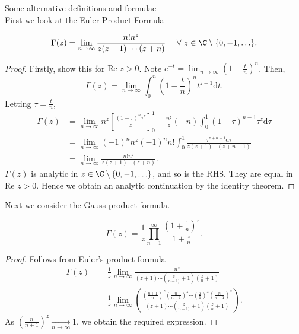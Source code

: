 \documentclass[a4paper]{article}
\begin{document}
\underline{Some alternative definitions and formulae} \\
First we look at the Euler Product Formula
\begin{claim}
    \[
        \Gamma(z) = \lim_{n \to \infty} \frac{n ! n^{z}}{ z( z + 1) \cdots (z +n)} \quad \ \forall \  z \in  \C\setminus \{0,-1, \ldots\} 
    .\]
\end{claim}
\begin{proof}
    Firstly, show this for $\text{Re }z > 0 $. Note $e^{ - t} = \lim_{n \to \infty} \left( 1- \frac{t}{n}\right)^{n}$. Then,
    \[
        \Gamma(z) = \lim_{n \to \infty} \int_0^{n} \left( 1 - \frac{t}{n}\right)^{n} t ^{ z - 1}\text{d}t
    .\]
    Letting $\tau = \frac{t}{n}$,
    \begin{align*}
         \Gamma(z) &= \lim_{n \to \infty} n^{z} \left[ \frac{ (  1 - \tau)^{n} \tau^{z}}{z} \right]_0^{1} - \frac{n^{z}}{z} (-n)\int_0^{1} ( 1- \tau)^{n - 1} \tau^{z} \text{d} \tau \\
        &= \lim_{n \to \infty}(-1)^{n} n^{z} (-1)^{n} n! \int_0^{1} \frac{\tau^{ z + n - 1} \text{d} \tau}{ z ( z + 1) \cdots ( z + n -1)} \\
        &= \lim_{n \to \infty} \frac{ n! n^{z}}{ z ( z + 1) \cdots ( z  + n)}
    .\end{align*}
    $\Gamma(z)$ is analytic in $z \in  \C \setminus \{ 0, -1, \ldots\} $, and so is the RHS. They are equal in $\text{Re }z > 0$. Hence we obtain an analytic continuation by the identity theorem.
\end{proof}
Next we consider the Gauss product formula.
\begin{claim}
     \[
         \Gamma(z) = \frac{1}{z} \prod_{n = 1}^{\infty} \frac{ ( 1+ \frac{1}{n})^{z}}{1 + \frac{z}{n}}
    .\] 
\end{claim}
\begin{proof}
Follows from Euler's product formula
\begin{align*}
    \Gamma(z) &= \frac{1}{z} \lim_{ n \to \infty} \frac{n^{z}}{( z + 1)  \cdots (  \frac{z}{n - 1)} + 1 )( \frac{z}{n} + 1)} \\
    &= \frac{1}{z} \lim_{n \to \infty} \left( \frac{ \left( \frac{n +1}{n} \right)^{z}  \left( \frac{ n }{n -1} \right)^{z} \cdots \left( \frac{2}{1} \right)^{z} \left( \frac{n }{n + 1} \right)^{z}   }{ ( z + 1)  \cdots (  \frac{z}{n - 1)} + 1 )( \frac{z}{n} + 1)} \right) 
.\end{align*}
As $\left( \frac{n }{n + 1} \right)^{z} \underset{ n \to \infty}{\to} 1$, we obtain the required expression.
\end{proof}
\end{document}

